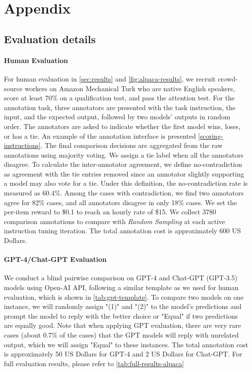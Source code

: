 \documentclass[11pt]{article}
\begin{document}
\appendix

\section{Appendix}
\label{sec:appendix}
\subsection{Evaluation details}
\label{subsec:human-eval}
\paragraph{Human Evaluation}
For human evaluation in \autoref{sec:results} and \autoref{fig:alpaca-results}, we recruit crowd-source workers on Amazon Mechanical Turk who are native English speakers, score at least 70\% on a qualification test, and pass the attention test. For the annotation task, three annotators are presented with the task instruction, the input, and the expected output, followed by two models' outputs in random order. The annotators are asked to indicate whether the first model wins, loses, or has a tie. An example of the annotation interface is presented \autoref{scoring-instructions}. The final comparison decisions are aggregated from the raw annotations using majority voting. We assign a tie label when all the annotators disagree. To calculate the inter-annotator agreement, we define no-contradiction as agreement with the tie entries removed since an annotator slightly supporting a model may also vote for a tie. Under this definition, the no-contradiction rate is measured as 60.4\%. Among the cases with contradiction, we find two annotators agree for 82\% cases, and all annotators disagree in only 18\% cases. We set the per-item reward to \$0.1 to reach an hourly rate of \$15. We collect 3780 comparison annotations to compare  with \textit{Random Sampling} at each active instruction tuning iteration. The total annotation cost is approximately 600 US Dollars.
\paragraph{GPT-4/Chat-GPT Evaluation}
We conduct a blind pairwise comparison on GPT-4 and Chat-GPT (GPT-3.5) models using Open-AI API, following a similar template as we used for human evaluation, which is shown in \autoref{tab:gpt-template}. To compare two models on one instance, we will randomly assign "(1)" and "(2)" to the model's predictions and prompt the model to reply with the better choice or "Equal" if two predictions are equally good. Note that when applying GPT evaluation, there are very rare cases (about 0.7\% of the cases) that the GPT models will reply with unrelated output, which we will assign "Equal" to these instances. The total annotation cost is approximately 50 US Dollars for GPT-4 and 2 US Dollars for Chat-GPT. For full evaluation results, please refer to \autoref{tab:full-results-alpaca}
\end{document}
